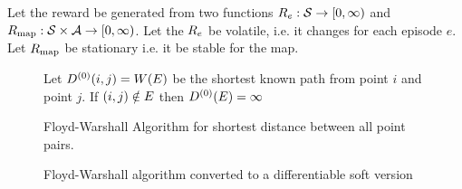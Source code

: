 Let the reward be generated from two functions $R_{e} : \mathcal{S} \rightarrow [0, \infty)$ and
  $ R_{\text{map}} : \mathcal{S} \times \mathcal{A} \rightarrow [0, \infty) $.
    Let the $R_{e}$ be volatile, i.e. it changes for each episode $e$.
    Let $R_{\text{map}}$ be stationary i.e. it be stable for the map.
\begin{figure}%
  \begin{minipage}[t]{0.5\textwidth}
    \begin{algorithm}[H]
      Let $D^{(0)}(i, j) = W(E)$ be the shortest known path from point $i$ and point $j$. \;
      If $(i, j) \notin E$ then $D^{(0)}(E) = \infty$ \;
      \caption{\small Floyd-Warshall Algorithm for shortest distance between all point pairs.}
      \label{alg:floyd-warshall}
    \end{algorithm}
  \end{minipage}%
  \begin{minipage}[t]{0.5\textwidth}
  \end{minipage}
  \caption{Floyd-Warshall algorithm converted to a differentiable soft version}
\end{figure}%

